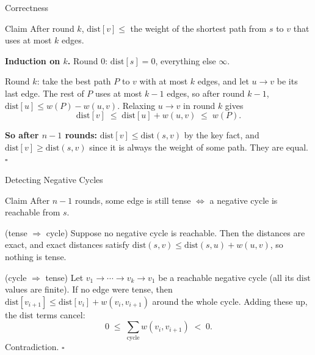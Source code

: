 \documentclass[10pt,aspectratio=169]{beamer}
\begin{document}
\begin{frame}{Correctness}
  \begin{block}{Claim}
    After round $k$, $\text{dist}[v] \le$ the weight of the shortest path
    from $s$ to $v$ that uses at most $k$ edges.
  \end{block}

  \bigskip
  \textbf{Induction on $k$.} Round $0$: $\text{dist}[s] = 0$, everything
  else $\infty$.

  \bigskip
  Round $k$: take the best path $P$ to $v$ with at most $k$ edges, and let
  $u \to v$ be its last edge. The rest of $P$ uses at most $k - 1$ edges,
  so after round $k - 1$, $\text{dist}[u] \le w(P) - w(u, v)$. Relaxing
  $u \to v$ in round $k$ gives
  \[
    \text{dist}[v] \;\le\; \text{dist}[u] + w(u, v) \;\le\; w(P).
  \]

  \pause
  \textbf{So after $n - 1$ rounds:} $\text{dist}[v] \le \text{dist}(s, v)$
  by the key fact, and $\text{dist}[v] \ge \text{dist}(s, v)$ since it is
  always the weight of some path. They are equal. $\square$
\end{frame}

\begin{frame}{Detecting Negative Cycles}
  \begin{block}{Claim}
    After $n - 1$ rounds, some edge is still tense $\iff$ a negative cycle is
    reachable from $s$.
  \end{block}

  \bigskip
  (tense $\Rightarrow$ cycle) Suppose no negative cycle is reachable. Then
  the distances are exact, and exact distances satisfy
  $\text{dist}(s, v) \le \text{dist}(s, u) + w(u, v)$, so nothing is tense.

  \pause
  \bigskip
  (cycle $\Rightarrow$ tense) Let $v_1 \to \cdots \to v_k \to v_1$ be a reachable
  negative cycle (all its $\text{dist}$ values are finite). If no edge were
  tense, then $\text{dist}[v_{i+1}] \le \text{dist}[v_i] + w(v_i, v_{i+1})$
  around the whole cycle. Adding these up, the $\text{dist}$ terms cancel:
  \[
    0 \;\le\; \sum_{\text{cycle}} w(v_i, v_{i+1}) \;<\; 0.
  \]
  Contradiction. $\square$
\end{frame}
\end{document}
